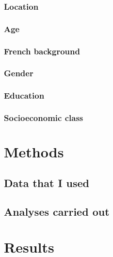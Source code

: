       \subsubsection{Location}
      \subsubsection{Age}
      \subsubsection{French background}
      \subsubsection{Gender}
      \subsubsection{Education}
      \subsubsection{Socioeconomic class}
  \section{Methods}
    \subsection{Data that I used}
    \subsection{Analyses carried out}
  \section{Results}